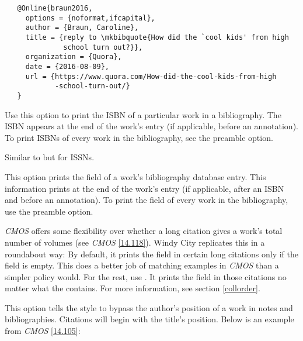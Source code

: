 \documentclass[11pt,letterpaper,oneside]{article}
\begin{document}
\begin{optionlist}
\begin{verbatim}
   @Online{braun2016,
     options = {noformat,ifcapital},
     author = {Braun, Caroline},
     title = {reply to \mkbibquote{How did the `cool kids' from high
              school turn out?}},
     organization = {Quora},
     date = {2016-08-09},
     url = {https://www.quora.com/How-did-the-cool-kids-from-high
            -school-turn-out/}
   }
\end{verbatim}

\begin{citebib}
\item \cite{braun2016}
\end{citebib}


\noindent Use this option to print the ISBN of a particular work in a
bibliography. The ISBN appears at the end of the work's entry (if
applicable, before an annotation). To print ISBNs of every work in the
bibliography, see the  preamble option.


\noindent Similar to  but for ISSNs.


\noindent This option prints the  field of a work's
bibliography database entry. This information prints at the end of the
work's entry (if applicable, after an ISBN and before an annotation).
To print the  field of every work in the
bibliography, use the  preamble option.


\noindent \textit{CMOS} offers some flexibility over whether a long
citation gives a work's total number of volumes (see \textit{CMOS}
\ref{14.118}). Windy City replicates this in a roundabout way: By
default, it prints the  field in certain long
citations only if the  field is empty. This does a
better job of matching examples in \textit{CMOS} than a simpler policy
would. For the rest, use . It prints the
 field in those citations no matter what the
 contains. For more information, see section
\ref{collorder}.


\noindent This option tells the style to bypass the author's position
of a work in notes and bibliographies. Citations will begin with the
title's position. Below is an example from \textit{CMOS} \ref{14.105}:


\end{optionlist}
\end{document}
